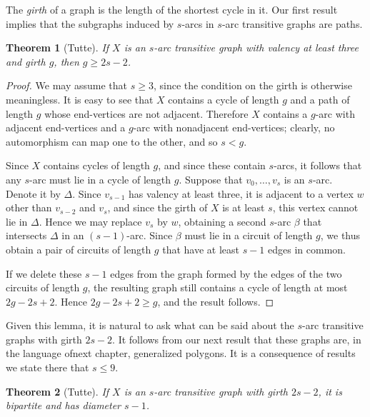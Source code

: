 \documentclass[12pt,a4paper,openany]{book}
\newtheorem{theorem}{Theorem}[section]
\begin{document}
The \emph{girth} of a graph is the length of the shortest cycle in it. Our first result implies that the subgraphs induced by $s$-arcs in $s$-arc transitive graphs are paths.

\begin{theorem}[Tutte]
If $X$ is an $s$-arc transitive graph with valency at least three and girth $g$, then $g \geq 2s - 2$.
\end{theorem}

\begin{proof}
We may assume that $s \geq 3$, since the condition on the girth is otherwise meaningless. It is easy to see that $X$ contains a cycle of length $g$ and a path of length $g$ whose end-vertices are not adjacent. Therefore $X$ contains a $g$-arc with adjacent end-vertices and a $g$-arc with nonadjacent end-vertices; clearly, no automorphism can map one to the other, and so $s < g$. 

Since $X$ contains cycles of length $g$, and since these contain $s$-arcs, it follows that any $s$-arc must lie in a cycle of length $g$. Suppose that $v_0, \ldots, v_s$ is an $s$-arc. Denote it by $\Delta$. Since $v_{s-1}$ has valency at least three, it is adjacent to a vertex $w$ other than $v_{s-2}$ and $v_s$, and since the girth of $X$ is at least $s$, this vertex cannot lie in $\Delta$. Hence we may replace $v_s$ by $w$, obtaining a second $s$-arc $\beta$ that intersects $\Delta$ in an $(s-1)$-arc. Since $\beta$ must lie in a circuit of length $g$, we thus obtain a pair of circuits of length $g$ that have at least $s - 1$ edges in common.

If we delete these $s - 1$ edges from the graph formed by the edges of the two circuits of length $g$, the resulting graph still contains a cycle of length at most $2g - 2s + 2$. Hence $2g - 2s + 2 \geq g$, and the result follows.
\end{proof}

Given this lemma, it is natural to ask what can be said about the $s$-arc transitive graphs with girth $2s - 2$. It follows from our next result that these graphs are, in the language ofnext chapter, generalized polygons. It is a consequence of results we state there that $s \leq 9$.

\begin{theorem}[Tutte]
If $X$ is an $s$-arc transitive graph with girth $2s - 2$, it is bipartite and has diameter $s - 1$.
\end{theorem}
\end{document}
